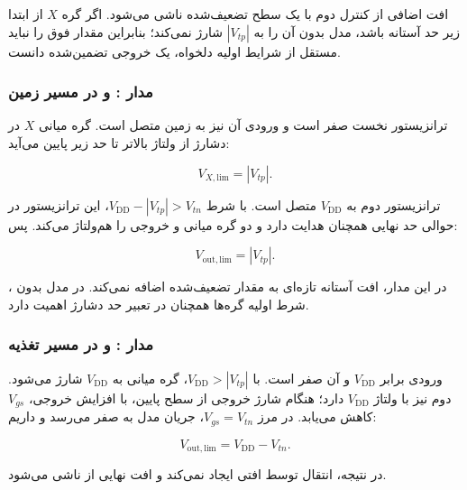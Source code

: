 افت اضافی از کنترل  دوم با یک سطح  تضعیف‌شده ناشی می‌شود. اگر گره \(X\) از ابتدا زیر حد آستانه باشد، مدل بدون  آن را به \(|V_{tp}|\) شارژ نمی‌کند؛ بنابراین مقدار فوق را نباید مستقل از شرایط اولیه دلخواه، یک خروجی  تضمین‌شده دانست.

\subsubsection*{مدار :  و  در مسیر زمین}

 ترانزیستور  نخست صفر است و ورودی آن نیز به زمین متصل است. گره میانی \(X\) در دشارژ از ولتاژ بالاتر تا حد زیر پایین می‌آید:

\nopagebreak[3]
\begin{equation}\label{eq:ex20-6}
V_{X,\mathrm{lim}}=|V_{tp}|.
\end{equation}

 ترانزیستور  دوم به \(V_{\mathrm{DD}}\) متصل است. با شرط \(V_{\mathrm{DD}}-|V_{tp}|>V_{tn}\)، این ترانزیستور در حوالی حد نهایی همچنان هدایت دارد و دو گره میانی و خروجی را هم‌ولتاژ می‌کند. پس:

\nopagebreak[3]
\begin{equation}\label{eq:ex20-7}
\boxed{V_{\mathrm{out,lim}}=|V_{tp}|}.
\end{equation}

در این مدار،  افت آستانه تازه‌ای به مقدار  تضعیف‌شده اضافه نمی‌کند. در مدل بدون ، شرط اولیه گره‌ها همچنان در تعبیر حد دشارژ اهمیت دارد.

\subsubsection*{مدار :  و  در مسیر تغذیه}

ورودی  برابر \(V_{\mathrm{DD}}\) و  آن صفر است. با \(V_{\mathrm{DD}}>|V_{tp}|\)، گره میانی به \(V_{\mathrm{DD}}\) شارژ می‌شود.  دوم نیز  با ولتاژ \(V_{\mathrm{DD}}\) دارد؛ هنگام شارژ خروجی از سطح پایین، با افزایش خروجی، \(V_{gs}\) کاهش می‌یابد. در مرز \(V_{gs}=V_{tn}\)، جریان مدل به صفر می‌رسد و داریم:

\nopagebreak[3]
\begin{equation}\label{eq:ex20-8}
\boxed{V_{\mathrm{out,lim}}=V_{\mathrm{DD}}-V_{tn}}.
\end{equation}

در نتیجه، انتقال  توسط  افتی ایجاد نمی‌کند و افت نهایی از  ناشی می‌شود.

